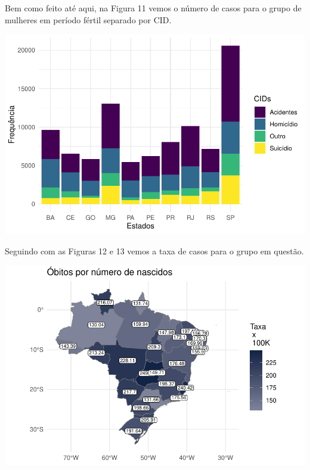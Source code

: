 \documentclass[
]{article}
\let\origfigure\figure
\let\endorigfigure\endfigure
\renewenvironment{figure}[1][2] {
    \expandafter\origfigure\expandafter[H]
} {
    \endorigfigure
}
\begin{document}
Bem como feito até aqui, na Figura 11 vemos o número de casos para o
grupo de mulheres em período fértil separado por CID.

\begin{figure}
\centering
\includegraphics{RelatorioV02_files/figure-latex/unnamed-chunk-20-1.pdf}
\caption{Estados por Número de CID`s para Mulheres em Período Fértil}
\end{figure}

Seguindo com as Figuras 12 e 13 vemos a taxa de casos para o grupo em
questão.

\begin{figure}
\centering
\includegraphics{RelatorioV02_files/figure-latex/unnamed-chunk-21-1.pdf}
\caption{Mulheres em Periodo Fértil}
\end{figure}
\end{document}
